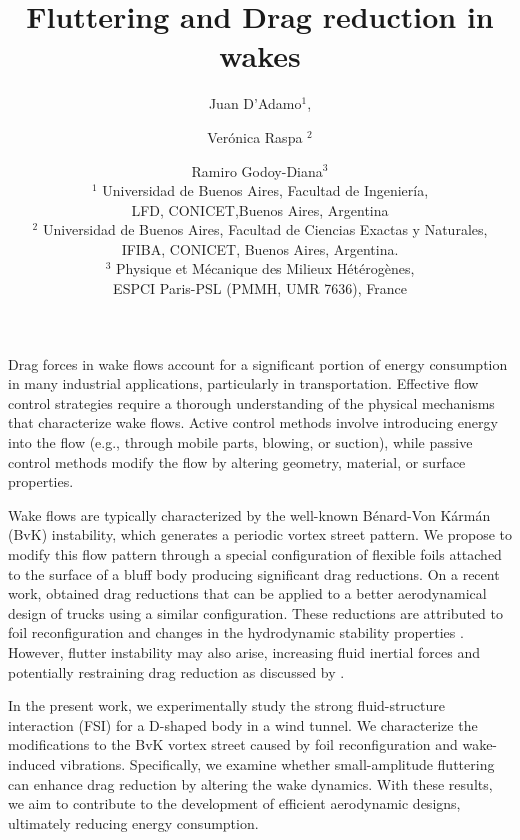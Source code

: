 \documentclass[a4paper,11pt]{article}
\begin{document}
\vspace{-1.0cm}

\title{Fluttering and Drag reduction in wakes}

\author{Juan D'Adamo$^1$, \and Verónica Raspa $^2$ \and Ramiro Godoy-Diana$^{3}$\\
  $^1$  Universidad de Buenos Aires, Facultad de Ingenier\'ia, \\LFD, CONICET,Buenos Aires, Argentina\\
  $^2$ Universidad de Buenos Aires, Facultad de Ciencias Exactas y Naturales,\\  IFIBA, CONICET,   Buenos Aires,  Argentina.\\
  $^3$ Physique et Mécanique des Milieux Hétérogènes, \\ESPCI Paris-PSL (PMMH, UMR 7636), France  
}
\date{}
\maketitle

Drag forces in wake flows account for a significant portion of energy consumption in many industrial applications, particularly in transportation. Effective flow control strategies require a thorough understanding of the physical mechanisms that characterize wake flows. Active control methods involve introducing energy into the flow (e.g., through mobile parts, blowing, or suction), while passive control methods modify the flow by altering geometry, material, or surface properties.


Wake flows are typically characterized by the well-known Bénard-Von Kármán (BvK) instability, which generates a periodic vortex street pattern. We propose to modify this flow pattern through a special configuration of flexible foils attached to the surface of a bluff body producing significant drag reductions. 	On a recent work, \cite{garcia2021drag} obtained drag reductions that can be applied to a better aerodynamical design of trucks using a similar configuration. 	
 These reductions are attributed to foil reconfiguration \cite{gosselin2010drag} and changes in the hydrodynamic stability properties \citep{strykowski1990formation,Giannetti:2007p127,thiria2009passive}. However, flutter instability may also arise, increasing fluid inertial forces and potentially restraining drag reduction as discussed by \cite{leclercq2018does}.
		 
	
	In the present work, we experimentally study the strong fluid-structure interaction (FSI) for a D-shaped body in a wind tunnel. We characterize the modifications to the BvK vortex street caused by foil reconfiguration and wake-induced vibrations. Specifically, we examine whether small-amplitude fluttering can enhance drag reduction by altering the wake dynamics. With these results, we aim to contribute to the development of efficient aerodynamic designs, ultimately reducing energy consumption.
	
\end{document}
